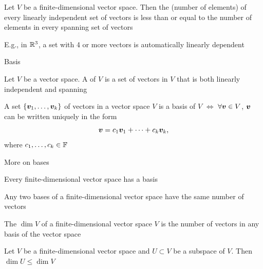 \documentclass[aspectratio=169]{beamer}\usepackage[]{graphicx}\usepackage[]{xcolor}
\begin{document}
\begin{frame}
	\begin{theorem}
		Let $V$ be a finite-dimensional vector space. Then the  (number of elements) of every linearly independent set of vectors is less than or equal to the number of elements in every spanning set of vectors
	\end{theorem}
	\vfill
	E.g., in $\mathbb{R}^3$, a set with 4 or more vectors is automatically linearly dependent
\end{frame}


\begin{frame}{Basis}
	\begin{definition}[Basis]
		Let $V$ be a vector space. A  of $V$ is a set of vectors in $V$ that is both linearly independent and spanning
	\end{definition}
	\vfill
	\begin{theorem}
		A set $\{\bm{v}_1,\ldots,\bm{v}_k\}$ of vectors in a vector space $V$ is a basis of $V$ $\iff$ $\forall \bm{v}\in V$, $\bm{v}$ can be written uniquely in the form
		\[
		\bm{v}=c_1\bm{v}_1+\cdots+c_k\bm{v}_k,
		\]
		where $c_1,\ldots,c_k\in\mathbb{F}$
	\end{theorem}
\end{frame}



\begin{frame}{More on bases}
	\begin{importanttheorem}
		Every finite-dimensional vector space has a basis
	\end{importanttheorem}
	\vfill
	\begin{theorem}
		Any two bases of a finite-dimensional vector space have the same number of vectors
	\end{theorem}
	\vfill
	\begin{definition}[Dimension]
		The  $\dim V$ of a finite-dimensional vector space $V$ is the number of vectors in any basis of the vector space
	\end{definition}
	\vfill
	\begin{theorem}
		Let $V$ be a finite-dimensional vector space and $U\subset V$ be a subspace of $V$. Then $\dim U\leq \dim V$
	\end{theorem}
\end{frame}
\end{document}

